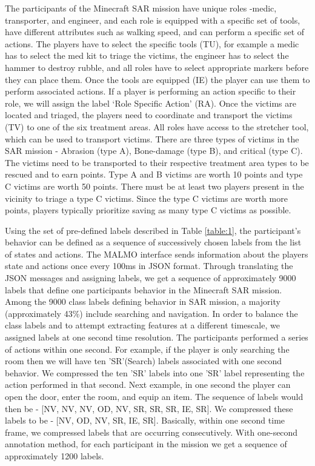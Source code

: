 \documentclass{article}
\begin{document}
The participants of the Minecraft SAR mission have unique roles -medic, transporter, and engineer, and each role is equipped with a specific set of tools, have different attributes such as walking speed, and can perform a specific set of actions. The players have to select the specific tools (TU), for example a medic has to select the med kit to triage the victims, the engineer has to select the hammer to destroy rubble, and  all roles have to select appropriate markers before they can place them. Once the tools are equipped (IE) the player can use them to perform associated actions. If a player is performing an action specific to their role, we will assign the label ‘Role Specific Action’ (RA). Once the victims are located and triaged, the players need to coordinate and transport the victims (TV) to one of the six treatment areas. All roles have access to the stretcher tool, which can be used to transport victims. There are three types of victims in the SAR mission - Abrasion (type A), Bone-damage (type B), and critical (type C). The victims need to be transported to their respective treatment area types to be rescued and to earn points. Type A and B victims are worth 10 points and type C victims are worth 50 points. There must be at least two players present in the vicinity to triage a type C victims. Since the type C victims are worth more points, players typically prioritize saving as many type C victims as possible.

Using the set of pre-defined labels described in Table \ref{table:1}, the participant's behavior can be defined as a sequence of successively chosen labels from the list of states and actions. The MALMO interface sends information about the players state and actions once every 100ms in JSON format. Through translating the JSON messages and assigning labels, we get a sequence of approximately 9000 labels that define one participants behavior in the Minecraft SAR mission.
Among the 9000 class labels defining behavior in SAR mission, a majority (approximately 43\%) include searching and navigation. In order to balance the class labels and to attempt extracting features at a different timescale, we assigned labels at one second time resolution. The participants performed a series of actions within one second. For example, if the player is only searching the room then we will have ten 'SR'(Search) labels associated with one second behavior. We compressed the ten 'SR' labels into one 'SR' label representing the action performed in that second. Next example, in one second the player can open the door, enter the room, and equip an item. The sequence of labels would then be - [NV, NV, NV, OD, NV, SR, SR, SR, IE, SR]. We compressed these labels to be - [NV, OD, NV, SR, IE, SR]. Basically, within one second time frame, we compressed labels that are occurring consecutively. With one-second annotation method, for each participant in the mission we get a sequence of approximately 1200 labels. 
\end{document}
